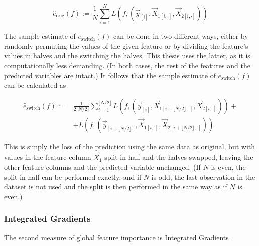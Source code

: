 		\begin{equation}
			\hat{e}_{\text{orig}}(f):= \frac{1}{N} \sum_{i=1}^{N} L\left(f, (\vec{y}_{[i]}, \vec{X}_{1[i,\cdot]}, \vec{X}_{2[i,\cdot]}) \right)
		\end{equation} 
		
		The sample estimate of $e_{\text{switch}}(f)$ can be done in two different ways, either by randomly permuting the values of the given feature or by dividing the feature's values in halves and the switching the halves. This thesis uses the latter, as it is computationally less demanding. (In both cases, the rest of the features and the predicted variables are intact.) It follows that the sample estimate of $e_{\text{switch}}(f)$ can be calculated as
		
		
		\begin{equation}
			\begin{split}
				\hat{e}_{\text{switch}}(f):= & \frac{1}{2 \lfloor N/2 \rfloor} \sum_{i=1}^{\lfloor N/2 \rfloor} L \left(f, \left( \vec{y}_{[i]}, \vec{X}_{1[i+\lfloor N/2 \rfloor,\cdot]},\vec{X}_{2[i,\cdot]} \right) \right) + \\ 
				& + L \left( f, \left(\vec{y}_{[i+\lfloor N/2 \rfloor]}, \vec{X}_{1[i,\cdot]},\vec{X}_{2[i+\lfloor N/2 \rfloor,\cdot]} \right) \right). 
			\end{split}
		\end{equation}
		
		This is simply the loss of the prediction using the same data as original, but with values in the feature column $\vec{X}_1$ split in half and the halves swapped, leaving the other feature columns and the predicted variable unchanged. (If $N$ is even, the split in half can be performed exactly, and if $N$ is odd, the last observation in the dataset is not used and the split is then performed in the same way as if $N$ is even.) 
	
		
	\subsubsection{Integrated Gradients}
		The second measure of global feature importance is Integrated Gradients \citep{sundararajan2017axiomatic}. 


